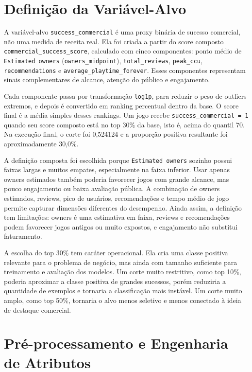 \documentclass[12pt]{article}
\begin{document}
\section{Definição da Variável-Alvo}

A variável-alvo \texttt{success\_commercial} é uma proxy binária de sucesso comercial, não uma medida de receita real. Ela foi criada a partir do score composto \texttt{commercial\_success\_score}, calculado com cinco componentes: ponto médio de \texttt{Estimated owners} (\texttt{owners\_midpoint}), \texttt{total\_reviews}, \texttt{peak\_ccu}, \texttt{recommendations} e \texttt{average\_playtime\_forever}. Esses componentes representam sinais complementares de alcance, atenção do público e engajamento.

Cada componente passa por transformação \texttt{log1p}, para reduzir o peso de outliers extremos, e depois é convertido em ranking percentual dentro da base. O score final é a média simples desses rankings. Um jogo recebe \texttt{success\_commercial = 1} quando seu score composto está no top 30\% da base, isto é, acima do quantil 70. Na execução final, o corte foi 0,524124 e a proporção positiva resultante foi aproximadamente 30,0\%.

A definição composta foi escolhida porque \texttt{Estimated owners} sozinho possui faixas largas e muitos empates, especialmente na faixa inferior. Usar apenas owners estimados também poderia favorecer jogos com grande alcance, mas pouco engajamento ou baixa avaliação pública. A combinação de owners estimados, reviews, pico de usuários, recomendações e tempo médio de jogo permite capturar dimensões diferentes do desempenho. Ainda assim, a definição tem limitações: owners é uma estimativa em faixa, reviews e recomendações podem favorecer jogos antigos ou muito expostos, e engajamento não substitui faturamento.

A escolha do top 30\% tem caráter operacional. Ela cria uma classe positiva relevante para o problema de negócio, mas ainda com tamanho suficiente para treinamento e avaliação dos modelos. Um corte muito restritivo, como top 10\%, poderia aproximar a classe positiva de grandes sucessos, porém reduziria a quantidade de exemplos e tornaria a classificação mais instável. Um corte muito amplo, como top 50\%, tornaria o alvo menos seletivo e menos conectado à ideia de destaque comercial.

\section{Pré-processamento e Engenharia de Atributos}
\end{document}

